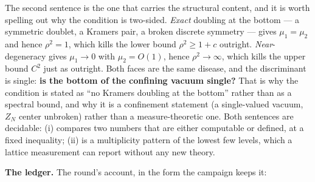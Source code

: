 The second sentence is the one that carries the structural content, and it is worth spelling out why
the condition is two-sided. \emph{Exact} doubling at the bottom --- a symmetric doublet, a Kramers
pair, a broken discrete symmetry --- gives $\mu_1=\mu_2$ and hence $\rho^2=1$, which kills the lower
bound $\rho^2\ge1+c$ outright. \emph{Near}-degeneracy gives $\mu_1\to0$ with $\mu_2=O(1)$, hence
$\rho^2\to\infty$, which kills the upper bound $C^2$ just as outright. Both faces are the same
disease, and the discriminant is single: \textbf{is the bottom of the confining vacuum single?} That
is why the condition is stated as ``no Kramers doubling at the bottom'' rather than as a spectral
bound, and why it is a confinement statement (a single-valued vacuum, $Z_N$ center unbroken) rather
than a measure-theoretic one. Both sentences are decidable: (i) compares two numbers that are
either computable or defined, at a fixed inequality; (ii) is a multiplicity pattern of the lowest
few levels, which a lattice measurement can report without any new theory.

\textbf{The ledger.} The round's account, in the form the campaign keeps it:


